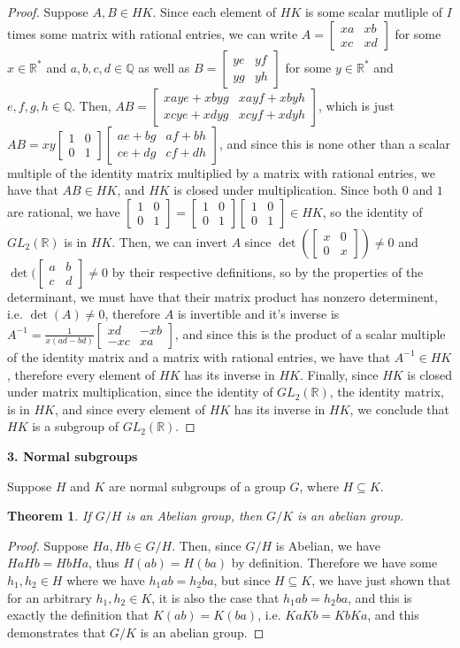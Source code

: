 \documentclass[12pt]{article}
\newcommand{\reals}{\mathbb{R}}
\newcommand{\rats}{\mathbb{Q}}
\newcommand{\gltwo}{GL_2(\reals)}
\newcommand{\glmatrix}[4]{\ensuremath{\begin{bmatrix} #1 & #2 \\ #3 & #4 \end{bmatrix}}}
\newtheorem{thm}{Theorem}
\begin{document}
\begin{proof}
	Suppose $A,B \in HK$.
	Since each element of $HK$ is some scalar mutliple of $I$
	times some matrix with rational entries,
	we can write $A = \glmatrix{xa}{xb}{xc}{xd}$ for some $x \in \reals^*$ and $a,b,c,d \in \rats$
	as well as $B = \glmatrix{ye}{yf}{yg}{yh}$ for some $y \in \reals^*$ and $e,f,g,h \in \rats$.
	Then, $AB = \glmatrix{xaye + xbyg}{xayf + xbyh}{xcye + xdyg}{xcyf + xdyh}$,
	which is just $AB = xy\glmatrix{1}{0}{0}{1}\glmatrix{ae + bg}{af + bh}{ce + dg}{cf + dh}$,
	and since this is none other than a scalar multiple of the identity matrix
	multiplied by a matrix with rational entries, we have that $AB \in HK$,
	and $HK$ is closed under multiplication.
	Since both $0$ and $1$ are rational, we have
	$\glmatrix{1}{0}{0}{1} =  \glmatrix{1}{0}{0}{1}\glmatrix{1}{0}{0}{1} \in HK$,
	so the identity of $\gltwo$ is in $HK$.
	Then, we can invert $A$ since $\det(\glmatrix{x}{0}{0}{x}) \neq 0$
	and $\det(\glmatrix{a}{b}{c}{d} \neq 0$
	by their respective definitions,
	so by the properties of the determinant,
	we must have that their matrix product
	has nonzero determinent, i.e. $\det(A) \neq 0$,
	therefore $A$ is invertible and it's inverse
	is $A^{-1} = \frac{1}{x(ad - bd)} \glmatrix{xd}{-xb}{-xc}{xa}$,
	and since this is the product of a scalar multiple of the identity matrix
	and a matrix with rational entries, we have that $A^{-1} \in HK$,
	therefore every element of $HK$ has its inverse in $HK$.
	Finally, since $HK$ is closed under matrix multiplication,
	since the identity of $\gltwo$, the identity matrix, is in $HK$,
	and since every element of $HK$ has its inverse in $HK$,
	we conclude that $HK$ is a subgroup of $\gltwo$.
\end{proof}

\textbf{3. Normal subgroups}

Suppose $H$ and $K$ are normal subgroups of a group $G$,
where $H \subseteq K$.

\begin{thm}
	If $G/H$ is an Abelian group, then $G/K$ is an abelian group.
\end{thm}

\begin{proof}
	Suppose $Ha, Hb \in G/H$.
	Then, since $G/H$ is Abelian,
	we have $HaHb = HbHa$,
	thus $H(ab) = H(ba)$ by definition.
	Therefore we have some $h_1, h_2 \in H$
	where we have $h_1ab = h_2ba$,
	but since $H \subseteq K$,
	we have just shown that for an arbitrary $h_1,h_2 \in K$,
	it is also the case that $h_1ab = h_2ba$,
	and this is exactly the definition
	that $K(ab) = K(ba)$, i.e. $KaKb = KbKa$,
	and this demonstrates that $G/K$ is an abelian group.
\end{proof}
\end{document}
